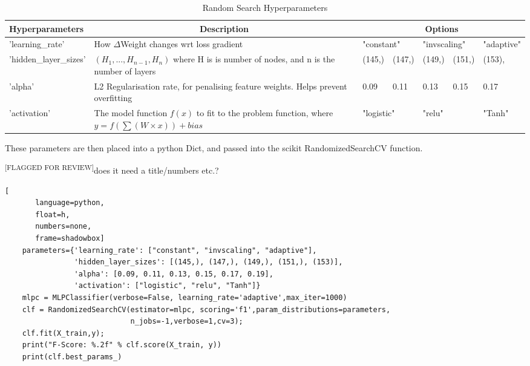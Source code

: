 \documentclass{UoNMCHA}
\newcommand{\flagforreview}{\textsuperscript{\color{red} [FLAGGED FOR REVIEW]}}
\numberwithin{equation}{section}
\begin{document}
\begin{table}[h]
    \begin{center}  
    \caption{Random Search Hyperparameters}\label{tab:RandCV_HyperOptions}
        \begin{tabular}{p{3cm}p{6.0cm}p{0.8cm}p{0.8cm}p{0.8cm}p{0.8cm}p{1.8cm}}%
            \hline\hline 
            Hyperparameters        & \multicolumn{1}{c}{Description}                                                            & \multicolumn{5}{c}{Options}                                \\
            \hline 
            'learning\_rate'       & How $\Delta$Weight changes wrt loss gradient                                               & \multicolumn{2}{l}{"constant"} & \multicolumn{2}{l}{"invscaling"} & "adaptive" \\ %
            'hidden\_layer\_sizes' & $(H_1, ..., H_{n-1}, H_n)$ where H is is number of nodes, and n is the number of layers    & (145,)     & (147,)       & (149,)     & (151,) & (153), \\
            'alpha'                & L2 Regularisation rate, for penalising feature weights. Helps prevent overfitting          & 0.09       & 0.11         & 0.13       & 0.15   & 0.17   \\
            'activation'           & The model function $f(x)$ to fit to the problem function,  where $y = f(\sum(W \times x)) + bias$                         & \multicolumn{2}{l}{"logistic"} & \multicolumn{2}{l}{"relu"}       & "Tanh"     \\%
            \hline 
        \end{tabular}
    \end{center}
\end{table}

These parameters are then placed into a python Dict, and passed into the scikit RandomizedSearchCV function.

\flagforreview does it need a title/numbers etc.?
\begin{lstlisting}[
       language=python,
       float=h,
       numbers=none,
       frame=shadowbox]
    parameters={'learning_rate': ["constant", "invscaling", "adaptive"],
                'hidden_layer_sizes': [(145,), (147,), (149,), (151,), (153)],
                'alpha': [0.09, 0.11, 0.13, 0.15, 0.17, 0.19],
                'activation': ["logistic", "relu", "Tanh"]}
    mlpc = MLPClassifier(verbose=False, learning_rate='adaptive',max_iter=1000)
    clf = RandomizedSearchCV(estimator=mlpc, scoring='f1',param_distributions=parameters,
                             n_jobs=-1,verbose=1,cv=3);
    clf.fit(X_train,y);    
    print("F-Score: %.2f" % clf.score(X_train, y))
    print(clf.best_params_)
\end{lstlisting}
\end{document}
